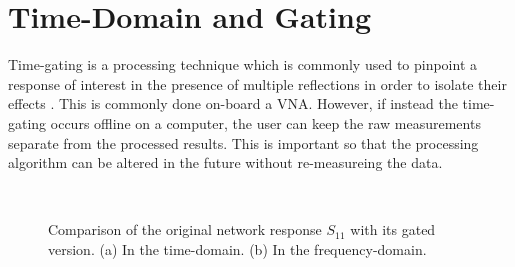 \documentclass{IEEEjmw}
\begin{document}
\section{Time-Domain and Gating}
Time-gating is a processing technique which is commonly used to pinpoint a response of interest in the presence of multiple reflections in order to isolate their effects \cite{cronson1973, bennett1978}. This is commonly done on-board a VNA. However, if instead the time-gating occurs offline on a computer, the user can keep the raw measurements separate from the processed results. This is important so that the processing algorithm can be altered in the future without re-measureing the data. 

\begin{figure}
	\centering
	\\
	\caption{Comparison of the original network response $S_{11}$ with its gated version. (a) In the time-domain. (b) In the frequency-domain.}
	\label{figs:gating}
\end{figure}
\end{document}
